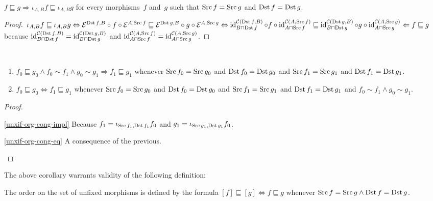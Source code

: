 \begin{lem}
$f\sqsubseteq g\Rightarrow
\iota_{A,B}f\sqsubseteq\iota_{A,B}g$ for every
morphisms~$f$ and~$g$ such that
$\operatorname{Src} f=\operatorname{Src} g$ and $\operatorname{Dst} f=\operatorname{Dst} g$.
\end{lem}

\begin{proof}
$\iota_{A,B}f\sqsubseteq\iota_{A,B}g \Leftrightarrow
\mathcal{E}^{\operatorname{Dst} f,B}\circ f\circ\mathcal{E}^{A,\operatorname{Src} f}
\sqsubseteq
\mathcal{E}^{\operatorname{Dst} g,B}\circ g\circ\mathcal{E}^{A,\operatorname{Src} g}
\Leftrightarrow
\operatorname{id}^{\mathcal{C}(\operatorname{Dst} f,B)}_{B\sqcap\operatorname{Dst} f}\circ f\circ\operatorname{id}^{\mathcal{C}(A,\operatorname{Src} f)}_{A\sqcap\operatorname{Src} f}
\sqsubseteq
\operatorname{id}^{\mathcal{C}(\operatorname{Dst} g,B)}_{B\sqcap\operatorname{Dst} g}\circ g\circ\operatorname{id}^{\mathcal{C}(A,\operatorname{Src} g)}_{A\sqcap\operatorname{Src} g}
\Leftarrow f\sqsubseteq g$ because
$\operatorname{id}^{\mathcal{C}(\operatorname{Dst} f,B)}_{B\sqcap\operatorname{Dst} f}=
\operatorname{id}^{\mathcal{C}(\operatorname{Dst} g,B)}_{B\sqcap\operatorname{Dst} g}$ and
$\operatorname{id}^{\mathcal{C}(A,\operatorname{Src} f)}_{A\sqcap\operatorname{Src} f}=
\operatorname{id}^{\mathcal{C}(A,\operatorname{Src} g)}_{A\sqcap\operatorname{Src} g}$.
\end{proof}

\begin{cor}\label{unxif-org-cong}
~
\begin{enumerate}
\item\label{unxif-org-cong-impl}
$f_0\sqsubseteq g_0\land f_0\sim f_1\land g_0\sim g_1
\Rightarrow f_1\sqsubseteq g_1$ whenever
$\operatorname{Src} f_0=\operatorname{Src} g_0$ and $\operatorname{Dst} f_0=\operatorname{Dst} g_0$ and
$\operatorname{Src} f_1=\operatorname{Src} g_1$ and $\operatorname{Dst} f_1=\operatorname{Dst} g_1$.
\item\label{unxif-org-cong-eq}
$f_0\sqsubseteq g_0\Leftrightarrow f_1\sqsubseteq g_1$ whenever
$\operatorname{Src} f_0=\operatorname{Src} g_0$ and $\operatorname{Dst} f_0=\operatorname{Dst} g_0$ and
$\operatorname{Src} f_1=\operatorname{Src} g_1$ and $\operatorname{Dst} f_1=\operatorname{Dst} g_1$ and
$f_0\sim f_1\land g_0\sim g_1$.
\end{enumerate}
\end{cor}

\begin{proof}
~
\begin{disorder}
\item[\ref{unxif-org-cong-impl}] Because
$f_1=\iota_{\operatorname{Src} f_1,\operatorname{Dst} f_1}f_0$ and
$g_1=\iota_{\operatorname{Src} g_1,\operatorname{Dst} g_1}f_0$.
\item[\ref{unxif-org-cong-eq}] A consequence of the
previous.
\end{disorder}
\end{proof}

The above corollary warrants validity of the following
definition:

\begin{defn}
The order on the set of unfixed morphisms is defined
by the formula
$[f]\sqsubseteq[g]\Leftrightarrow f\sqsubseteq g$
whenever $\operatorname{Src} f=\operatorname{Src} g\land\operatorname{Dst} f=\operatorname{Dst} g$.
\end{defn}

